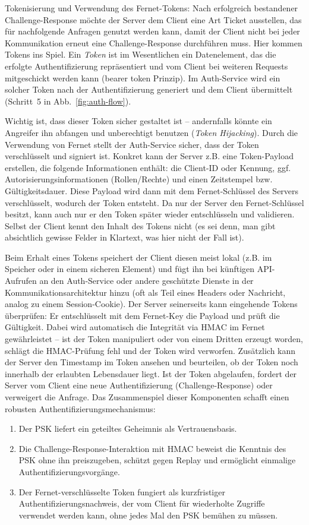 Tokenisierung und Verwendung des Fernet-Tokens: Nach erfolgreich bestandener Chal\-lenge-Res\-ponse möchte der Server dem Client eine Art \glqq Ticket\grqq{} ausstellen, das für nachfolgende Anfragen genutzt werden kann, damit der Client nicht bei jeder Kommunikation erneut eine Challenge-Response durchführen muss. Hier kommen Tokens ins Spiel. Ein \textit{Token} ist im Wesentlichen ein Datenelement, das die erfolgte Authentifizierung repräsentiert und vom Client bei weiteren Requests mitgeschickt werden kann (\glqq bearer token\grqq{} Prinzip). Im Auth-Service wird ein solcher Token nach der Authentifizierung generiert und dem Client übermittelt (Schritt 5 in Abb.~\ref{fig:auth-flow}).

Wichtig ist, dass dieser Token sicher gestaltet ist – andernfalls könnte ein Angreifer ihn abfangen und unberechtigt benutzen (\textit{Token Hijacking}). Durch die Verwendung von Fernet stellt der Auth-Service sicher, dass der Token verschlüsselt und signiert ist. Konkret kann der Server z.B. eine Token-Payload erstellen, die folgende Informationen enthält: die Client-ID oder Kennung, ggf. Autorisierungsinformationen (Rollen/Rechte) und einen Zeitstempel bzw. Gültigkeitsdauer. Diese Payload wird dann mit dem Fernet-Schlüssel des Servers verschlüsselt, wodurch der Token entsteht. Da nur der Server den Fernet-Schlüssel besitzt, kann auch nur er den Token später wieder entschlüsseln und validieren. Selbst der Client kennt den Inhalt des Tokens nicht (es sei denn, man gibt absichtlich gewisse Felder in Klartext, was hier nicht der Fall ist).

Beim Erhalt eines Tokens speichert der Client diesen meist lokal (z.B. im Speicher oder in einem sicheren Element) und fügt ihn bei künftigen API-Aufrufen an den Auth-Service oder andere geschützte Dienste in der Kommunikationsarchitektur hinzu (oft als Teil eines Headers oder Nachricht, analog zu einem Session-Cookie). Der Server seinerseits kann eingehende Tokens überprüfen: Er entschlüsselt mit dem Fernet-Key die Payload und prüft die Gültigkeit. Dabei wird automatisch die Integrität via HMAC im Fernet gewährleistet – ist der Token manipuliert oder von einem Dritten erzeugt worden, schlägt die HMAC-Prüfung fehl und der Token wird verworfen. Zusätzlich kann der Server den Timestamp im Token ansehen und beurteilen, ob der Token noch innerhalb der erlaubten Lebensdauer liegt. Ist der Token abgelaufen, fordert der Server vom Client eine neue Authentifizierung (Challenge-Response) oder verweigert die Anfrage.
Das Zusammenspiel dieser Komponenten schafft einen robusten Authentifizierungsmechanismus:
\begin{enumerate}
    \item Der PSK liefert ein geteiltes Geheimnis als Vertrauensbasis.
    \item Die Challenge-Response-Interaktion mit HMAC beweist die Kenntnis des PSK ohne ihn preiszugeben, schützt gegen Replay und ermöglicht einmalige Authentifizierungsvorgänge.
    \item Der Fernet-verschlüsselte Token fungiert als kurzfristiger Authentifizierungsnachweis, der vom Client für wiederholte Zugriffe verwendet werden kann, ohne jedes Mal den PSK bemühen zu müssen.
\end{enumerate}


